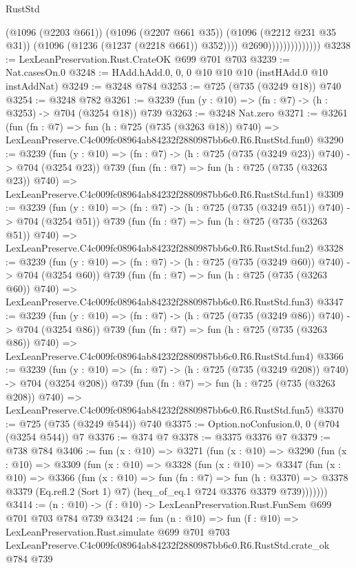 \begin{lexlean}{RustStd}
\begin{coremodule}
                                    (@1096 (@2203 @661))
                                    (@1096 (@2207 @661 @35))
                                    (@1096 (@2212 @231 @35 @31))
                                    (@1096 (@1236 (@1237 (@2218 @661)) @352))))
                                @2690))))))))))))))
@3238 := LexLeanPreservation.Rust.CrateOK @699 @701 @703
@3239 := Nat.casesOn.{0}
@3248 := HAdd.hAdd.{0, 0, 0} @10 @10 @10 (instHAdd.{0} @10 instAddNat)
@3249 := @3248 @784
@3253 := @725 (@735 (@3249 @18)) @740
@3254 := @3248 @782
@3261 := @3239 (fun (y : @10) => (fn : @7) -> (h : @3253) -> @704 (@3254 @18)) @739
@3263 := @3248 Nat.zero
@3271 := @3261
    (fun (fn : @7) =>
    fun (h : @725 (@735 (@3263 @18)) @740) =>
    LexLeanPreserve.C4c009fc08964ab84232f2880987bb6c0.R6.RustStd.fun0)
@3290 := @3239
    (fun (y : @10) => (fn : @7) -> (h : @725 (@735 (@3249 @23)) @740) -> @704 (@3254 @23))
    @739
    (fun (fn : @7) =>
    fun (h : @725 (@735 (@3263 @23)) @740) =>
    LexLeanPreserve.C4c009fc08964ab84232f2880987bb6c0.R6.RustStd.fun1)
@3309 := @3239
    (fun (y : @10) => (fn : @7) -> (h : @725 (@735 (@3249 @51)) @740) -> @704 (@3254 @51))
    @739
    (fun (fn : @7) =>
    fun (h : @725 (@735 (@3263 @51)) @740) =>
    LexLeanPreserve.C4c009fc08964ab84232f2880987bb6c0.R6.RustStd.fun2)
@3328 := @3239
    (fun (y : @10) => (fn : @7) -> (h : @725 (@735 (@3249 @60)) @740) -> @704 (@3254 @60))
    @739
    (fun (fn : @7) =>
    fun (h : @725 (@735 (@3263 @60)) @740) =>
    LexLeanPreserve.C4c009fc08964ab84232f2880987bb6c0.R6.RustStd.fun3)
@3347 := @3239
    (fun (y : @10) => (fn : @7) -> (h : @725 (@735 (@3249 @86)) @740) -> @704 (@3254 @86))
    @739
    (fun (fn : @7) =>
    fun (h : @725 (@735 (@3263 @86)) @740) =>
    LexLeanPreserve.C4c009fc08964ab84232f2880987bb6c0.R6.RustStd.fun4)
@3366 := @3239
    (fun (y : @10) => (fn : @7) -> (h : @725 (@735 (@3249 @208)) @740) -> @704 (@3254 @208))
    @739
    (fun (fn : @7) =>
    fun (h : @725 (@735 (@3263 @208)) @740) =>
    LexLeanPreserve.C4c009fc08964ab84232f2880987bb6c0.R6.RustStd.fun5)
@3370 := @725 (@735 (@3249 @544)) @740
@3375 := Option.noConfusion.{0, 0} (@704 (@3254 @544)) @7
@3376 := @374 @7
@3378 := @3375 @3376 @7
@3379 := @738 @784
@3406 := fun (x : @10) =>
  @3271
    (fun (x : @10) =>
    @3290
      (fun (x : @10) =>
      @3309
        (fun (x : @10) =>
        @3328
          (fun (x : @10) =>
          @3347
            (fun (x : @10) =>
            @3366
              (fun (x : @10) =>
              fun (fn : @7) =>
              fun (h : @3370) =>
              @3378 @3379 (Eq.refl.{2} (Sort 1) @7) (heq_of_eq.{1} @724 @3376 @3379 @739)))))))
@3414 := (n : @10) -> (f : @10) -> LexLeanPreservation.Rust.FunSem @699 @701 @703 @784 @739
@3424 := fun (n : @10) =>
  fun (f : @10) =>
  LexLeanPreservation.Rust.simulate
    @699
    @701
    @703
    LexLeanPreserve.C4c009fc08964ab84232f2880987bb6c0.R6.RustStd.crate_ok
    @784
    @739
\end{coremodule}
\end{lexlean}
